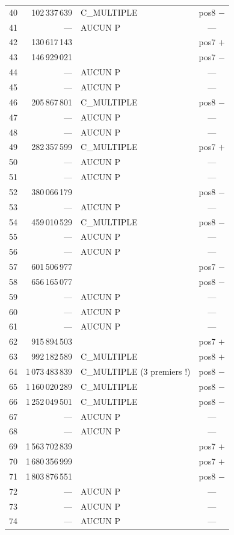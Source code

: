 \documentclass[11pt,a4paper]{article}
\begin{document}
{\begin{longtable}{@{}c r l c@{}}
40 & 102\,337\,639 & C\_MULTIPLE & pos8 $-$ \\
41 & --- & AUCUN P & --- \\
42 & 130\,617\,143 & & pos7 $+$ \\
43 & 146\,929\,021 & & pos7 $-$ \\
44 & --- & AUCUN P & --- \\
45 & --- & AUCUN P & --- \\
46 & 205\,867\,801 & C\_MULTIPLE & pos8 $-$ \\
47 & --- & AUCUN P & --- \\
48 & --- & AUCUN P & --- \\
49 & 282\,357\,599 & C\_MULTIPLE & pos7 $+$ \\
50 & --- & AUCUN P & --- \\
51 & --- & AUCUN P & --- \\
52 & 380\,066\,179 & & pos8 $-$ \\
53 & --- & AUCUN P & --- \\
54 & 459\,010\,529 & C\_MULTIPLE & pos8 $-$ \\
55 & --- & AUCUN P & --- \\
56 & --- & AUCUN P & --- \\
57 & 601\,506\,977 & & pos7 $-$ \\
58 & 656\,165\,077 & & pos8 $-$ \\
59 & --- & AUCUN P & --- \\
60 & --- & AUCUN P & --- \\
61 & --- & AUCUN P & --- \\
62 & 915\,894\,503 & & pos7 $+$ \\
63 & 992\,182\,589 & C\_MULTIPLE & pos8 $+$ \\
64 & 1\,073\,483\,839 & C\_MULTIPLE (3 premiers !) & pos8 $-$ \\
65 & 1\,160\,020\,289 & C\_MULTIPLE & pos8 $-$ \\
66 & 1\,252\,049\,501 & C\_MULTIPLE & pos8 $-$ \\
67 & --- & AUCUN P & --- \\
68 & --- & AUCUN P & --- \\
69 & 1\,563\,702\,839 & & pos7 $+$ \\
70 & 1\,680\,356\,999 & & pos7 $+$ \\
71 & 1\,803\,876\,551 & & pos8 $-$ \\
72 & --- & AUCUN P & --- \\
73 & --- & AUCUN P & --- \\
74 & --- & AUCUN P & --- \\

\end{longtable}}
\end{document}
